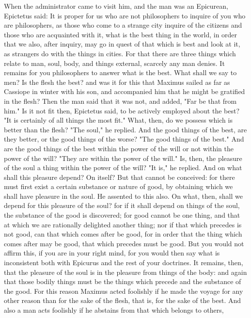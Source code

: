\documentclass[a4paper]{article}
\begin{document}
    When the administrator came to visit him, and the man was an Epicurean,
Epictetus said: It is proper for us who are not philosophers to inquire of you
who are philosophers, as those who come to a strange city inquire of the
citizens and those who are acquainted with it, what is the best thing in the
world, in order that we also, after inquiry, may go in quest of that which is
best and look at it, as strangers do with the things in cities. For that there
are three things which relate to man, soul, body, and things external, scarcely
any man denies. It remains for you philosophers to answer what is the best.
What shall we say to men? Is the flesh the best? and was it for this that
Maximus sailed as far as Cassiope in winter with his son, and accompanied him
that he might be gratified in the flesh? Then the man said that it was not, and
added, "Far be that from him." Is it not fit then, Epictetus said, to be
actively employed about the best? "It is certainly of all things the most fit."
What, then, do we possess which is better than the flesh? "The soul," he
replied. And the good things of the best, are they better, or the good things
of the worse? "The good things of the best." And are the good things of the
best within the power of the will or not within the power of the will? "They
are within the power of the will." Is, then, the pleasure of the soul a thing
within the power of the will? "It is," he replied. And on what shall this
pleasure depend? On itself? But that cannot be conceived: for there must first
exist a certain substance or nature of good, by obtaining which we shall have
pleasure in the soul. He assented to this also. On what, then, shall we depend
for this pleasure of the soul? for if it shall depend on things of the soul,
the substance of the good is discovered; for good cannot be one thing, and that
at which we are rationally delighted another thing; nor if that which precedes
is not good, can that which comes after be good, for in order that the thing
which comes after may be good, that which precedes must be good. But you would
not affirm this, if you are in your right mind, for you would then say what is
inconsistent both with Epicurus and the rest of your doctrines. It remains,
then, that the pleasure of the soul is in the pleasure from things of the body:
and again that those bodily things must be the things which precede and the
substance of the good.
    For this reason Maximus acted foolishly if he made the voyage for any other
reason than for the sake of the flesh, that is, for the sake of the best. And
also a man acts foolishly if he abstains from that which belongs to others,
\end{document}
